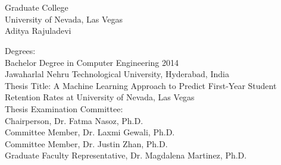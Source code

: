 \documentclass[11pt,openright]{report}
\begin{document}
\vita
\chapter{} %
\linespread{1.3} 
\begin{center}
Graduate College\\
University of Nevada, Las Vegas\\[1cm]
Aditya Rajuladevi\\[1cm]
\end{center}

\noindent Degrees:\\
\indent Bachelor Degree in Computer Engineering 2014\\
\indent Jawaharlal Nehru Technological University, Hyderabad, India\\

\noindent Thesis Title: A Machine Learning Approach to Predict First-Year Student Retention Rates at University of Nevada, Las Vegas\\

\noindent Thesis Examination Committee:\\
\indent Chairperson, Dr. Fatma Nasoz, Ph.D.\\
\indent Committee Member, Dr. Laxmi Gewali, Ph.D.\\
\indent Committee Member, Dr. Justin Zhan, Ph.D.\\
\indent Graduate Faculty Representative, Dr. Magdalena Martinez, Ph.D.\\
\end{document}
